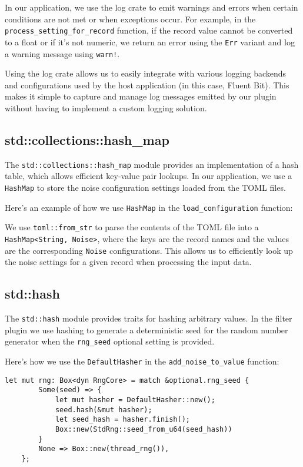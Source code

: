 In our application, we use the log crate to emit warnings and errors when certain conditions are not met or when exceptions occur. For example, in the \texttt{process\_setting\_for\_record} function, if the record value cannot be converted to a float or if it's not numeric, we return an error using the \texttt{Err} variant and log a warning message using \texttt{warn!}.

Using the log crate allows us to easily integrate with various logging backends and configurations used by the host application (in this case, Fluent Bit). This makes it simple to capture and manage log messages emitted by our plugin without having to implement a custom logging solution.

\subsection{std::collections::hash\_map}
The \texttt{std::collections::hash\_map} module provides an implementation of a hash table, which allows efficient key-value pair lookups. In our application, we use a \texttt{HashMap} to store the noise configuration settings loaded from the TOML files.

Here's an example of how we use \texttt{HashMap} in the \texttt{load\_configuration} function:



We use \texttt{toml::from\_str} to parse the contents of the TOML file into a \texttt{HashMap<String, Noise>}, where the keys are the record names and the values are the corresponding \texttt{Noise} configurations. This allows us to efficiently look up the noise settings for a given record when processing the input data.

\subsection{std::hash}
The \texttt{std::hash} module provides traits for hashing arbitrary values. In the filter plugin we use hashing to generate a deterministic seed for the random number generator when the \texttt{rng\_seed} optional setting is provided.

Here's how we use the \lstinline|DefaultHasher| in the \texttt{add\_noise\_to\_value} function:

\begin{verbatim}
let mut rng: Box<dyn RngCore> = match &optional.rng_seed {
        Some(seed) => {
            let mut hasher = DefaultHasher::new();
            seed.hash(&mut hasher);
            let seed_hash = hasher.finish();
            Box::new(StdRng::seed_from_u64(seed_hash))
        }
        None => Box::new(thread_rng()),
    };
\end{verbatim}


